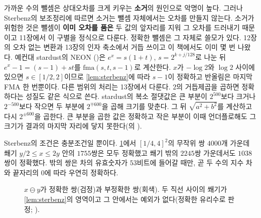 가까운 수의 뺄셈은 상대오차를 크게 키우는 \textbf{소거}의 원인으로 악명이 높다. 그러나 Sterbenz의 보조정리에 따르면 소거는 뺄셈 자체에서는 오차를 만들지 않는다. 소거가 위험한 것은 뺄셈이 \textbf{이미 오차를 품은} 두 값의 앞자리를 지워 그 오차를 드러내기 때문이고 11장에서 이 구별을 정식으로 다룬다. 정확한 뺄셈은 그 자체로 쓸모가 있다. 12장의 오차 없는 변환과 13장의 인자 축소에서 거듭 쓰이고 이 책에서도 이미 몇 번 나왔다. 예컨대 stardust의 NEON ()은 $e^x=s(1+t)$, $s=2^{k+j/128}$로 나눈 뒤 $e^x-1=(s-1)+st$를 $\mathrm{fma}(s,t,s-1)$로 계산한다. $x$가 $-\log2$와 $\log2$ 사이에 있으면 $s\in[1/2,2]$이므로 \cref{lem:sterbenz}에 따라 $s-1$이 정확하고 반올림은 마지막 FMA 한 번뿐이다. 다른 범위의 처리는 13장에서 다룬다. $2$의 거듭제곱을 곱하면 정확하다는 성질도 같은 식으로 쓴다. stardust의 복소 절댓값은 큰 부분이 $2^{500}$보다 크거나 $2^{-500}$보다 작으면 두 부분에 $2^{\mp600}$을 곱해 크기를 맞춘다. 그 뒤 $\sqrt{a^2+b^2}$를 계산하고 다시 $2^{\pm600}$을 곱한다. 큰 부분을 곱한 값은 정확하고 작은 부분이 이때 언더플로해도 그 크기가 결과의 마지막 자리에 닿지 못한다(의 ).

Sterbenz의 조건은 충분조건일 뿐이다. \cref{fig:sterbenz}에서 $[1/4,4]^2$의 무작위 쌍 $4000$개 가운데 쐐기 $y/2\le x\le2y$ 안의 $1755$쌍은 모두 정확했고 쐐기 밖의 $2245$쌍 가운데서도 $1038$쌍이 정확했다. 밖의 쌍은 차의 유효숫자가 $53$비트에 들어갈 때만, 곧 두 수의 지수 차와 끝자리의 $0$에 따라 우연히 정확하다.

\begin{figure}[htbp]
\centering
{}
\caption{$x\ominus y$가 정확한 쌍(검정)과 부정확한 쌍(회색). 두 직선 사이의 쐐기가 \cref{lem:sterbenz}의 영역이고 그 안에서는 예외가 없다(정확한 유리수로 판정; ).}
\label{fig:sterbenz}
\end{figure}

